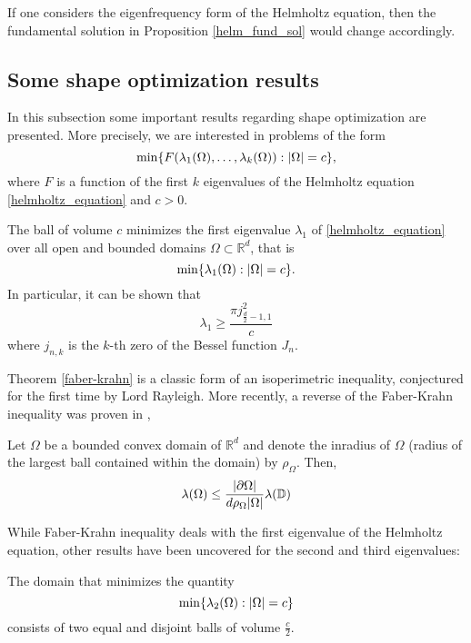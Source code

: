 If one considers the eigenfrequency form of the Helmholtz equation, then the fundamental solution in Proposition \eqref{helm_fund_sol} would change accordingly.

\subsection{Some shape optimization results}

In this subsection some important results regarding shape optimization are presented. More precisely, we are interested in problems of the form
\begin{equation}\label{shape_prob}
    \min\{F(\lambda_1(\Omega),\dots, \lambda_k(\Omega)): \abs{\Omega} = c\},
\end{equation}
where \(F\) is a function of the first \(k\) eigenvalues of the Helmholtz equation \eqref{helmholtz_equation} and \(c > 0\).

\begin{theorem}\label{faber-krahn}
    The ball of volume \(c\) minimizes the first eigenvalue \(\lambda_1\) of \eqref{helmholtz_equation} over all open and bounded domains \(\Omega \subset \mathbb{R}^d\), that is
    \[
    \min\{\lambda_1(\Omega): \abs{\Omega} = c\}.
    \]
    In particular, it can be shown that
    \[
    \lambda_1 \geq \frac{\pi j_{\frac{d}{2}-1,1}^2}{c}    
    \]
    where \(j_{n, k}\) is the \(k\)-th zero of the Bessel function \(J_n\).
\end{theorem}

Theorem \ref*{faber-krahn} is a classic form of an isoperimetric inequality, conjectured for the first time by Lord Rayleigh. More recently, a reverse of the Faber-Krahn inequality was proven in \cite{freitas2008sharp},
\begin{theorem}\label{reverse_faber-krahn}
    Let \(\Omega\) be a bounded convex domain of \(\mathbb{R}^d\) and denote the inradius of \(\Omega\) (radius of the largest ball contained within the domain) by \(\rho_\Omega\). Then,
    \[
    \lambda(\Omega) \leq \frac{\abs{\partial \Omega}}{d \rho_\Omega \abs{\Omega}} \lambda(\mathbb{D})
    \]
\end{theorem}   

While Faber-Krahn inequality deals with the first eigenvalue of the Helmholtz equation, other results have been uncovered for the second and third eigenvalues:

\begin{theorem}
    The domain that minimizes the quantity
    \[
    \min\{\lambda_2(\Omega): \abs{\Omega} = c\}
    \]
    consists of two equal and disjoint balls of volume \(\frac{c}{2}\).
\end{theorem}

